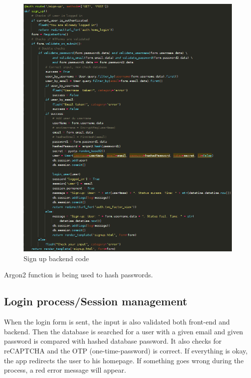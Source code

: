 \begin{figure}[H]
    \centering
    \includegraphics[width=\textwidth]{pics/pic7 signup.png}
    \caption{Sign up backend code}
    \label{fig:cha2fig2signupcode}
\end{figure}

Argon2 function is being used to hash passwords.

\subsection{Login process/Session management}

When the login form is sent, the input is also validated both front-end and backend. Then the database is searched for a user with a given email and given password is compared with hashed database password. It also checks for reCAPTCHA and the OTP (one-time-password) is correct. If everything is okay, the app redirects the user to his homepage. If something goes wrong during the process, a red error message will appear.

